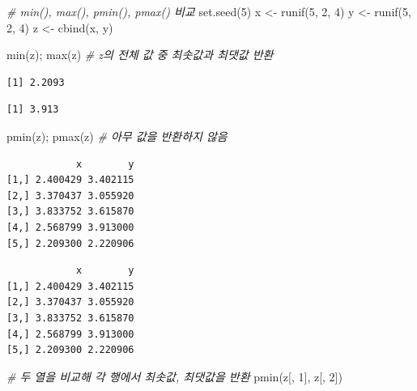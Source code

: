 \documentclass[
  11pt,
]{krantz}
\newenvironment{Shaded}{\begin{snugshade}}{\end{snugshade}}
\newcommand{\CommentTok}[1]{\textcolor[rgb]{0.37,0.37,0.37}{\textit{#1}}}
\newcommand{\DecValTok}[1]{\textcolor[rgb]{0.06,0.06,0.06}{#1}}
\newcommand{\FunctionTok}[1]{\textcolor[rgb]{0,0,0}{#1}}
\newcommand{\NormalTok}[1]{#1}
\newcommand{\OtherTok}[1]{\textcolor[rgb]{0.37,0.37,0.37}{#1}}
\begin{document}
\begin{Shaded}
\begin{Highlighting}[]
\CommentTok{\# min(), max(), pmin(), pmax() 비교}
\FunctionTok{set.seed}\NormalTok{(}\DecValTok{5}\NormalTok{)}
\NormalTok{x }\OtherTok{\textless{}{-}} \FunctionTok{runif}\NormalTok{(}\DecValTok{5}\NormalTok{, }\DecValTok{2}\NormalTok{, }\DecValTok{4}\NormalTok{)}
\NormalTok{y }\OtherTok{\textless{}{-}} \FunctionTok{runif}\NormalTok{(}\DecValTok{5}\NormalTok{, }\DecValTok{2}\NormalTok{, }\DecValTok{4}\NormalTok{)}
\NormalTok{z }\OtherTok{\textless{}{-}} \FunctionTok{cbind}\NormalTok{(x, y)}

\FunctionTok{min}\NormalTok{(z); }\FunctionTok{max}\NormalTok{(z) }\CommentTok{\# z의 전체 값 중 최솟값과 최댓값 반환}
\end{Highlighting}
\end{Shaded}

\begin{verbatim}
[1] 2.2093
\end{verbatim}

\begin{verbatim}
[1] 3.913
\end{verbatim}

\begin{Shaded}
\begin{Highlighting}[]
\FunctionTok{pmin}\NormalTok{(z); }\FunctionTok{pmax}\NormalTok{(z) }\CommentTok{\# 아무 값을 반환하지 않음}
\end{Highlighting}
\end{Shaded}

\begin{verbatim}
            x        y
[1,] 2.400429 3.402115
[2,] 3.370437 3.055920
[3,] 3.833752 3.615870
[4,] 2.568799 3.913000
[5,] 2.209300 2.220906
\end{verbatim}

\begin{verbatim}
            x        y
[1,] 2.400429 3.402115
[2,] 3.370437 3.055920
[3,] 3.833752 3.615870
[4,] 2.568799 3.913000
[5,] 2.209300 2.220906
\end{verbatim}

\begin{Shaded}
\begin{Highlighting}[]
\CommentTok{\# 두 열을 비교해 각 행에서 최솟값, 최댓값을 반환}
\FunctionTok{pmin}\NormalTok{(z[, }\DecValTok{1}\NormalTok{], z[, }\DecValTok{2}\NormalTok{]) }
\end{Highlighting}
\end{Shaded}
\end{document}
